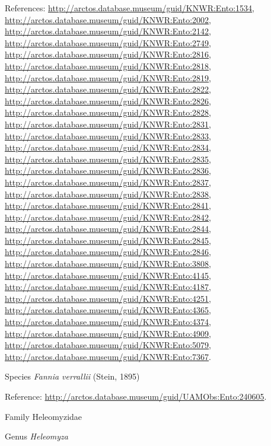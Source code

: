 \documentclass[9pt, article]{memoir}
\begin{document}
\begin{multicols}{2}
\vspace{6pt}References: 
\url{http://arctos.database.museum/guid/KNWR:Ento:1534}, 
\url{http://arctos.database.museum/guid/KNWR:Ento:2002}, 
\url{http://arctos.database.museum/guid/KNWR:Ento:2142}, 
\url{http://arctos.database.museum/guid/KNWR:Ento:2749}, 
\url{http://arctos.database.museum/guid/KNWR:Ento:2816}, 
\url{http://arctos.database.museum/guid/KNWR:Ento:2818}, 
\url{http://arctos.database.museum/guid/KNWR:Ento:2819}, 
\url{http://arctos.database.museum/guid/KNWR:Ento:2822}, 
\url{http://arctos.database.museum/guid/KNWR:Ento:2826}, 
\url{http://arctos.database.museum/guid/KNWR:Ento:2828}, 
\url{http://arctos.database.museum/guid/KNWR:Ento:2831}, 
\url{http://arctos.database.museum/guid/KNWR:Ento:2833}, 
\url{http://arctos.database.museum/guid/KNWR:Ento:2834}, 
\url{http://arctos.database.museum/guid/KNWR:Ento:2835}, 
\url{http://arctos.database.museum/guid/KNWR:Ento:2836}, 
\url{http://arctos.database.museum/guid/KNWR:Ento:2837}, 
\url{http://arctos.database.museum/guid/KNWR:Ento:2838}, 
\url{http://arctos.database.museum/guid/KNWR:Ento:2841}, 
\url{http://arctos.database.museum/guid/KNWR:Ento:2842}, 
\url{http://arctos.database.museum/guid/KNWR:Ento:2844}, 
\url{http://arctos.database.museum/guid/KNWR:Ento:2845}, 
\url{http://arctos.database.museum/guid/KNWR:Ento:2846}, 
\url{http://arctos.database.museum/guid/KNWR:Ento:3808}, 
\url{http://arctos.database.museum/guid/KNWR:Ento:4145}, 
\url{http://arctos.database.museum/guid/KNWR:Ento:4187}, 
\url{http://arctos.database.museum/guid/KNWR:Ento:4251}, 
\url{http://arctos.database.museum/guid/KNWR:Ento:4365}, 
\url{http://arctos.database.museum/guid/KNWR:Ento:4374}, 
\url{http://arctos.database.museum/guid/KNWR:Ento:4909}, 
\url{http://arctos.database.museum/guid/KNWR:Ento:5079}, 
\url{http://arctos.database.museum/guid/KNWR:Ento:7367}.

\vspace{6pt}\noindent\hspace{36pt}Species \textit{Fannia verrallii} (Stein, 1895)


\vspace{6pt}Reference: 
\url{http://arctos.database.museum/guid/UAMObs:Ento:240605}.

\vspace{6pt}\noindent\hspace{24pt}Family Heleomyzidae


\vspace{6pt}\noindent\hspace{30pt}Genus \textit{Heleomyza}



\end{multicols}
\end{document}
